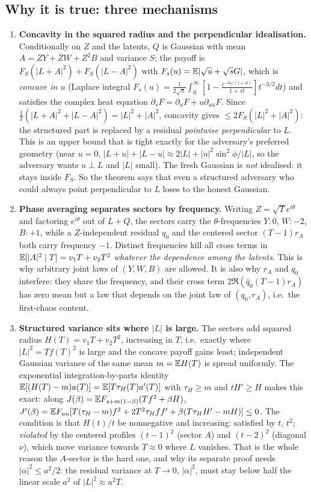 \subsection{Why it is true: three mechanisms}\label{sec:why}
\begin{enumerate}
\item \textbf{Concavity in the squared radius and the perpendicular idealisation.} Conditionally on $Z$ and the latents, $Q$ is Gaussian with mean $A=ZY+\bar ZW+Z^2B$ and variance $S$;
the payoff is $F_S(|L+A|^2)+F_S(|L-A|^2)$ with $F_s(u)=\mathbb E|\sqrt u+\sqrt sG|$, which is \emph{concave in $u$} (Laplace integral $F_s(u)=\frac1{2\sqrt\pi}\int_0^\infty[1-\frac{e^{-tu/(1+st)}}{1+st}]t^{-3/2}dt$) and
satisfies the complex heat equation $\partial_sF=\partial_uF+u\partial_{uu}F$. Since $\frac12(|L+A|^2+|L-A|^2)=|L|^2+|A|^2$, concavity gives $\le2F_S(|L|^2+|A|^2)$: the structured part is replaced by a
residual \emph{pointwise perpendicular} to $L$. This is an upper bound that is tight exactly for the adversary's preferred geometry (near $u=0$, $|L+u|+|L-u|\approx2|L|+|u|^2\sin^2\phi/|L|$, so the
adversary wants $u\perp L$ and $|L|$ small). The fresh Gaussian is \emph{not} idealised: it stays inside $F_S$. So the theorem says that even a structured adversary who could always
point perpendicular to $L$ loses to the honest Gaussian.
\item \textbf{Phase averaging separates sectors by frequency.} Writing $Z=\sqrt Te^{i\theta}$ and factoring $e^{i\theta}$ out of $L+Q$, the sectors carry the $\theta$-frequencies
$Y:0$, $W:-2$, $B:+1$, while a $Z$-independent residual $q_0$ and the centered sector $(T-1)r_A$ both carry frequency $-1$. Distinct frequencies kill all cross terms in
$\mathbb E[|A|^2\mid T]=v_1T+v_2T^2$ \emph{whatever the dependence among the latents}. This is why arbitrary joint laws of $(Y,W,B)$ are allowed. It is also why $r_A$ and $q_0$ interfere: they
share the frequency, and their cross term $2\Re(\bar q_0(T-1)r_A)$ has zero mean but a law that depends on the joint law of $(q_0,r_A)$, i.e.\ the first-chaos content.
\item \textbf{Structured variance sits where $|L|$ is large.} The sectors add squared radius $H(T)=v_1T+v_2T^2$, increasing in $T$, i.e.\ exactly where $|L|^2=Tf(T)^2$ is large and the
concave payoff gains least; independent Gaussian variance of the same mean $m=\mathbb E H(T)$ is spread uniformly. The exponential integration-by-parts identity
$\mathbb E[(H(T)-m)a(T)]=\mathbb E[T\tau_H(T)a'(T)]$ with $\tau_H\ge m$ and $tH'\ge H$ makes this exact: along $J(\beta)=\mathbb E F_{s+m(1-\beta)}(Tf^2+\beta H)$, $J'(\beta)=\mathbb E F_{uu}[T(\tau_H-m)f^2+2T^2\tau_Hff'+\beta(T\tau_HH'-mH)]\le0$.
The condition is that $H(t)/t$ be nonnegative and increasing: satisfied by $t$, $t^2$; \emph{violated} by the centered profiles $(t-1)^2$ (sector $A$) and $(t-2)^2$ (diagonal $\nu$), which move
variance towards $T\approx0$ where $L$ vanishes. That is the whole reason the $A$-sector is the hard one, and why its separate proof needs $|\alpha|^2\le a^2/2$: the residual variance at
$T\to0$, $|\alpha|^2$, must stay below half the linear scale $a^2$ of $|L|^2\approx a^2T$.
\end{enumerate}


